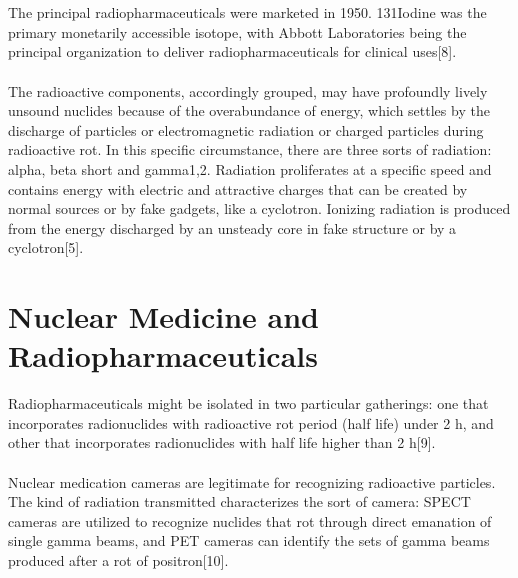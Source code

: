 \documentclass[12pt]{article}
\begin{document}
\\
\\
The principal radiopharmaceuticals were marketed in 1950. 131Iodine was the primary monetarily accessible isotope, with Abbott Laboratories being the principal organization to deliver radiopharmaceuticals for clinical uses[8]. 
\\
\\
The radioactive components, accordingly grouped, may have profoundly lively unsound nuclides because of the overabundance of energy, which settles by the discharge of particles or electromagnetic radiation or charged particles during radioactive rot. In this specific circumstance, there are three sorts of radiation: alpha, beta short and gamma1,2. Radiation proliferates at a specific speed and contains energy with electric and attractive charges that can be created by normal sources or by fake gadgets, like a cyclotron. Ionizing radiation is produced from the energy discharged by an unsteady core in fake structure or by a cyclotron[5].
\\
\section{Nuclear Medicine and Radiopharmaceuticals}
Radiopharmaceuticals might be isolated in two particular gatherings: one that incorporates radionuclides with radioactive rot period (half life) under 2 h, and other that incorporates radionuclides with half life higher than 2 h[9].
\\
\\
Nuclear medication cameras are legitimate for recognizing radioactive particles. The kind of radiation transmitted characterizes the sort of camera: SPECT cameras are utilized to recognize nuclides that rot through direct emanation of single gamma beams, and PET cameras can identify the sets of gamma beams produced after a rot of positron[10].
\end{document}
